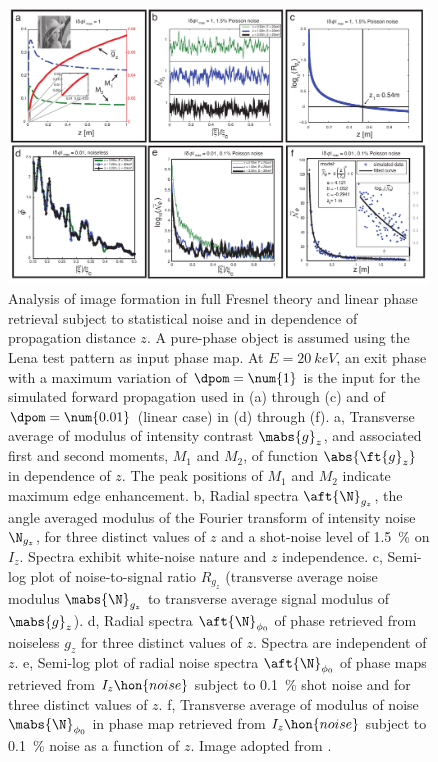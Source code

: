 \documentclass[
twoside,
openright,
titlepage,
numbers=noenddot,
headinclude,
fleqn,
a4paper,
footinclude=true,
cleardoublepage=empty,
abstractoff,
BCOR=5mm,
paper=a4,
fontsize=11pt,
british,ngerman,american,
]{scrreprt}
\begin{document}
\begin{figure}
  \centering
  \includegraphics[width=0.99\textwidth]
  {figures/Quasiparticle/Fig2.pdf}
  \caption[Image formation in full Fresnel theory and linear phase
  retrieval for the pure-phase case subject to statistical noise in
  dependence of propagation distance.]{Analysis of image formation in
    full Fresnel theory and linear phase retrieval subject to
    statistical noise and in dependence of propagation distance $z$.
    A pure-phase object is assumed using the Lena test pattern as
    input phase map.  At $E = \SI{20}{keV}$, an exit phase with a
    maximum variation of $\dpom = \num{1}$ is the input for the
    simulated forward propagation used in (a) through (c) and of
    $\dpom = \num{0.01}$ (linear case) in (d) through (f). a,
    Transverse average of modulus of intensity contrast $\mabs{g}_z$,
    and associated first and second moments, $M_1$ and $M_2$, of
    function $\abs{\ft{g}_z}$ in dependence of $z$. The peak positions
    of $M_1$ and $M_2$ indicate maximum edge enhancement.  b, Radial
    spectra $\aft{\N}_{g_z}$, \ie{} the angle averaged modulus of the
    Fourier transform of intensity noise $\N_{g_z}$, for three
    distinct values of $z$ and a shot-noise level of
    \SI{1.5}{\percent} on $I_z$.  Spectra exhibit white-noise nature
    and $z$ independence.  c, Semi-log plot of noise-to-signal ratio
    $R_{g_z}$ (transverse average noise modulus $\mabs{\N}_{g_z}$ to
    transverse average signal modulus of $\mabs{g}_z$).  d, Radial
    spectra $\aft{\N}_{\phi_0}$ of phase retrieved from noiseless
    $g_z$ for three distinct values of $z$.  Spectra are independent
    of $z$.  e, Semi-log plot of radial noise spectra
    $\aft{\N}_{\phi_0}$ of phase maps retrieved from $I_z\hon{noise}$
    subject to \SI{0.1}{\percent} shot noise and for three distinct
    values of $z$.  f, Transverse average of modulus of noise
    $\mabs{\N}_{\phi_0}$ in phase map retrieved from $I_z\hon{noise}$
    subject to \SI{0.1}{\percent} noise as a function of $z$.  Image
    adopted from \cite{Hofmann2014}.}
  \label{fig:qp-2}
\end{figure}
\end{document}

